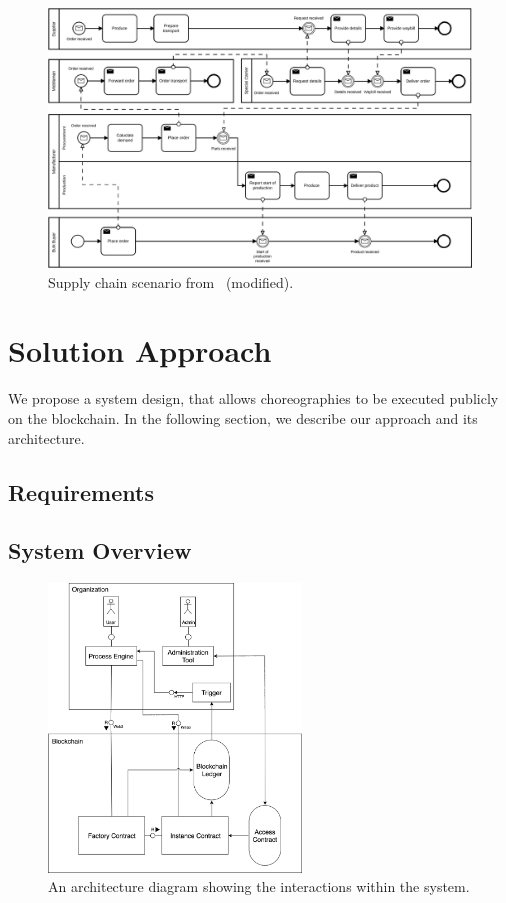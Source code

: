 \documentclass[runningheads]{llncs}
\begin{document}
\begin{figure}
	\centering
	\includegraphics[width=\textwidth]{fig/collaboration.eps}
	\caption{Supply chain scenario from~\cite{weber2016untrusted} (modified).}
	\label{fig:collaboration}
\end{figure}

\section{Solution Approach} \label{solutionapproach}
We propose a system design, that allows choreographies to be executed publicly on the blockchain.
In the following section, we describe our approach and its architecture.

\subsection{Requirements}

\subsection{System Overview}
\begin{figure}
	\centering
	\includegraphics[width=0.6\textwidth]{fig/system_diagram.eps}
	\caption{An architecture diagram showing the interactions within the system.}
	\label{fig:system_diagram}
\end{figure}
\end{document}
